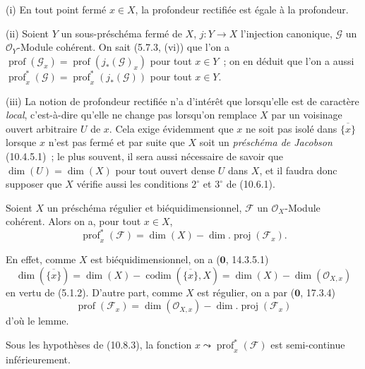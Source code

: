 \begin{remarks}[10.8.2]
\label{IV.10.8.2-fr}
(i) En tout point fermé $x\in X$, la profondeur rectifiée est égale à la
profondeur.

(ii) Soient $Y$ un sous-préschéma fermé de $X$, $j:Y\to X$ l'injection canonique,
$\mathcal G$ un $\mathcal O_Y$-Module cohérent. On sait (5.7.3, (vi)) que l'on a
$\operatorname{prof}(\mathcal G_x)=\operatorname{prof}(j_*(\mathcal G)_x)$ pour tout
$x\in Y$~; on en déduit que l'on a aussi
$\operatorname{prof}^{*}_{x}(\mathcal G)
=\operatorname{prof}^{*}_{x}(j_*(\mathcal G))$ pour tout $x\in Y$.

(iii) La notion de profondeur rectifiée n'a d'intérêt que lorsqu'elle est de
caractère \emph{local}, c'est-à-dire qu'elle ne change pas lorsqu'on remplace $X$
par un voisinage ouvert arbitraire $U$ de $x$. Cela exige évidemment que $x$ ne
soit pas isolé dans $\overline{\{x\}}$ lorsque $x$ n'est pas fermé et par suite
que $X$ soit un \emph{préschéma de Jacobson} (10.4.5.1)~; le plus souvent, il sera
aussi nécessaire de savoir que $\dim(U)=\dim(X)$ pour tout ouvert dense $U$ dans
$X$, et il faudra donc supposer que $X$ vérifie aussi les conditions $2^\circ$ et
$3^\circ$ de (10.6.1).
\end{remarks}

\begin{lemma}[10.8.3]
\label{IV.10.8.3-fr}
Soient $X$ un préschéma régulier et biéquidimensionnel, $\mathcal F$ un
$\mathcal O_X$-Module cohérent. Alors on a, pour tout $x\in X$,
\begin{equation}
\label{IV.10.8.3.1-fr}
\tag{10.8.3.1}
\operatorname{prof}^{*}_{x}(\mathcal F)
=\dim(X)-\dim.\operatorname{proj}(\mathcal F_x).
\end{equation}
\end{lemma}

En effet, comme $X$ est biéquidimensionnel, on a ($\mathbf 0$, 14.3.5.1)
\[
  \dim(\overline{\{x\}})=\dim(X)-\operatorname{codim}(\overline{\{x\}},X)
  =\dim(X)-\dim(\mathcal O_{X,x})
\]
en vertu de (5.1.2). D'autre part, comme $X$ est régulier, on a par
($\mathbf 0$, 17.3.4)
\[
  \operatorname{prof}(\mathcal F_x)
  =\dim(\mathcal O_{X,x})-\dim.\operatorname{proj}(\mathcal F_x)
\]
d'où le lemme.

\begin{corollary}[10.8.4]
\label{IV.10.8.4-fr}
Sous les hypothèses de \textup{(10.8.3)}, la fonction
$x\leadsto\operatorname{prof}^{*}_{x}(\mathcal F)$ est semi-continue inférieurement.
\end{corollary}

